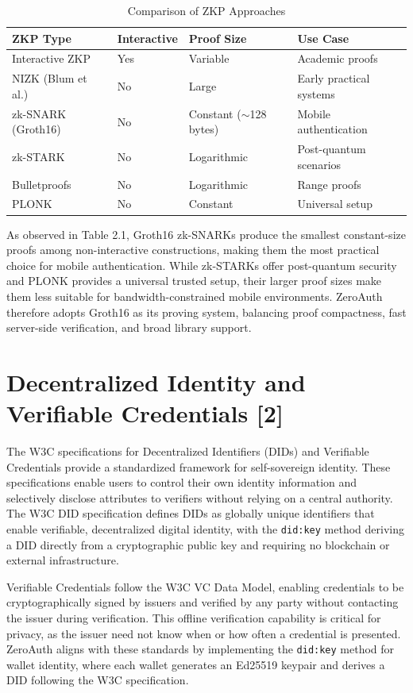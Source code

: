 \begin{table}[H]
\centering
\caption{Comparison of ZKP Approaches}
\begin{tabular}{|l|l|l|p{4cm}|}
\hline
\textbf{ZKP Type} & \textbf{Interactive} & \textbf{Proof Size} & \textbf{Use Case} \\
\hline
Interactive ZKP & Yes & Variable & Academic proofs \\
NIZK (Blum et al.) & No & Large & Early practical systems \\
zk-SNARK (Groth16) & No & Constant ($\sim$128 bytes) & Mobile authentication \\
zk-STARK & No & Logarithmic & Post-quantum scenarios \\
Bulletproofs & No & Logarithmic & Range proofs \\
PLONK & No & Constant & Universal setup \\
\hline
\end{tabular}
\end{table}

As observed in Table 2.1, Groth16 zk-SNARKs produce the smallest constant-size proofs among non-interactive constructions, making them the most practical choice for mobile authentication. While zk-STARKs offer post-quantum security and PLONK provides a universal trusted setup, their larger proof sizes make them less suitable for bandwidth-constrained mobile environments. ZeroAuth therefore adopts Groth16 as its proving system, balancing proof compactness, fast server-side verification, and broad library support.

\section{Decentralized Identity and Verifiable Credentials [2]}

The W3C specifications for Decentralized Identifiers (DIDs) and Verifiable Credentials provide a standardized framework for self-sovereign identity. These specifications enable users to control their own identity information and selectively disclose attributes to verifiers without relying on a central authority. The W3C DID specification defines DIDs as globally unique identifiers that enable verifiable, decentralized digital identity, with the \texttt{did:key} method deriving a DID directly from a cryptographic public key and requiring no blockchain or external infrastructure.

Verifiable Credentials follow the W3C VC Data Model, enabling credentials to be cryptographically signed by issuers and verified by any party without contacting the issuer during verification. This offline verification capability is critical for privacy, as the issuer need not know when or how often a credential is presented. ZeroAuth aligns with these standards by implementing the \texttt{did:key} method for wallet identity, where each wallet generates an Ed25519 keypair and derives a DID following the W3C specification.

